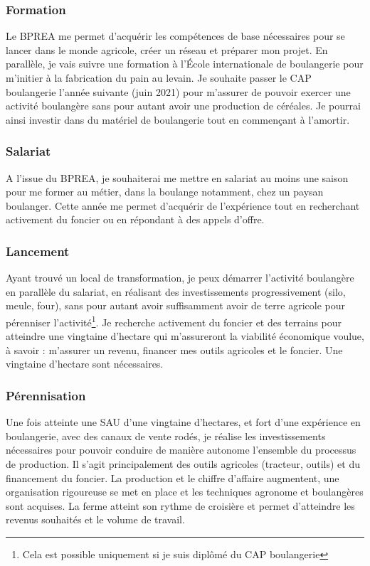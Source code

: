 \documentclass{article}
\begin{document}
\subsubsection*{Formation}

Le BPREA me permet d'acquérir les compétences de base nécessaires pour se lancer dans le monde agricole, créer un réseau et préparer mon projet. En parallèle, je vais suivre une formation à l'École internationale de boulangerie pour m'initier à la fabrication du pain au levain. Je souhaite passer le CAP boulangerie l'année suivante (juin 2021) pour m'assurer de pouvoir exercer une activité boulangère sans pour autant avoir une production de céréales. Je pourrai ainsi investir dans du matériel de boulangerie tout en commençant à l'amortir.

\subsubsection*{Salariat}

A l'issue du BPREA, je souhaiterai me mettre en salariat au moins une saison pour me former au métier, dans la boulange notamment, chez un paysan boulanger. Cette année me permet d'acquérir de l'expérience tout en recherchant activement du foncier ou en répondant à des appels d'offre.  

\subsubsection*{Lancement}

Ayant trouvé un local de transformation, je peux démarrer l'activité boulangère en parallèle du salariat, en réalisant des investissements progressivement (silo, meule, four), sans pour autant avoir suffisamment avoir de terre agricole pour pérenniser l'activité\footnote{Cela est possible uniquement si je suis diplômé du CAP boulangerie}. Je recherche activement du foncier et des terrains pour atteindre une vingtaine d'hectare qui m'assureront la viabilité économique voulue, à savoir : m'assurer un revenu, financer mes outils agricoles et le foncier. Une vingtaine d'hectare sont nécessaires. 

\subsubsection*{Pérennisation}

Une fois atteinte une SAU d'une vingtaine d'hectares, et fort d'une expérience en boulangerie, avec des canaux de vente rodés, je réalise les investissements nécessaires pour pouvoir conduire de manière autonome l'ensemble du processus de production. Il s'agit principalement des outils agricoles (tracteur, outils) et du financement du foncier. La production et le chiffre d'affaire augmentent, une organisation rigoureuse se met en place et les techniques agronome et boulangères sont acquises. La ferme atteint son rythme de croisière et permet d'atteindre les revenus souhaités et le volume de travail. 
\end{document}
